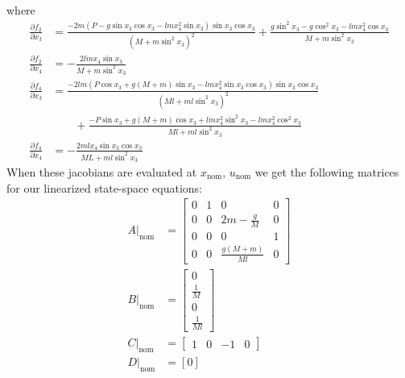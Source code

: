 \documentclass[11pt]{article}
\begin{document}
where
\begin{align*}
	\frac{\partial f_2}{\partial x_3} &= \frac{-2m(P-g\sin x_3\cos x_3-lmx_4^2\sin x_3)\sin x_3 \cos x_3}{(M+m\sin^2x_3)^2} + \frac{g\sin^2x_3 - g\cos^2x_3 - lmx_4^2\cos x_3}{M+m\sin^2x_3} \\
	\frac{\partial f_2}{\partial x_4} &= -\frac{2lmx_4\sin x_3}{M+m\sin^2x_3} \\
	\frac{\partial f_4}{\partial x_3} &= \frac{-2lm(P\cos x_3 + g(M+m)\sin x_3 - lmx_4^2\sin x_3 \cos x_3)\sin x_3 \cos x_3}{(Ml + ml\sin^2x_3)^2} \\ &\qquad + \frac{-P\sin x_3 + g(M+m)\cos x_3 + lmx_4^2\sin^2x_3 - lmx_4^2\cos^2x_3}{Ml + ml\sin^2x_3} \\
	\frac{\partial f_4}{\partial x_4} &= -\frac{2mlx_4\sin x_3 \cos x_3}{ML + ml\sin^2x_3}
\end{align*}
When these jacobians are evaluated at $x_\text{nom}$, $u_\text{nom}$ we get the following matrices for our linearized state-space equations:
\begin{align*}
	A|_\text{nom} &= \begin{bmatrix} 
					0 & 1 & 0 & 0 \\ 
					0 & 0 & 2m-\frac{g}{M} & 0 \\
					0 & 0 & 0 & 1 \\ 
					0 & 0 & \frac{g(M+m)}{Ml} & 0 \end{bmatrix} \\
	B|_\text{nom} &= \begin{bmatrix} 
					0 \\ \frac{1}{M} \\ 0 \\ \frac{1}{Ml} 
					\end{bmatrix} \\
	C|_\text{nom} &= \begin{bmatrix}
					1 & 0 & -1 & 0 \end{bmatrix} \\
	D|_\text{nom} &= [0]
\end{align*}
\end{document}
